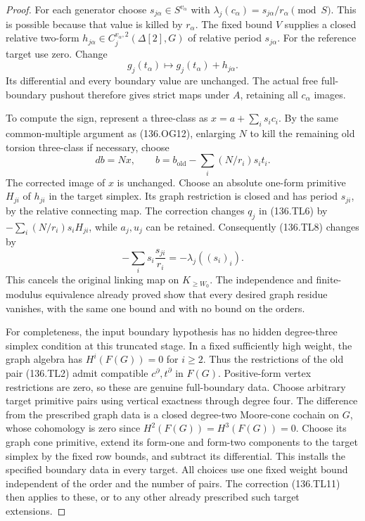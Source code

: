 \begin{proof}
For each generator choose \(s_{j\alpha}\in S^{v_\alpha}\)
with
\(\lambda_j(c_\alpha)=s_{j\alpha}/r_\alpha\pmod S\).
This is possible because that value is killed by \(r_\alpha\).
The fixed bound \(V\) supplies a closed relative two-form
\(h_{j\alpha}\in C_j^{v_\alpha,2}(\Delta[2],G)\)
of relative period \(s_{j\alpha}\).  For the reference
target use zero.  Change
\[
                   g_j(t_\alpha)\longmapsto
                                 g_j(t_\alpha)+h_{j\alpha}.
                                                               \tag{136.TL11}
\]
Its differential and every boundary value are unchanged.
The actual free full-boundary pushout therefore gives strict
maps under \(A\), retaining all \(c_\alpha\) images.

To compute the sign, represent a three-class as
\(x=a+\sum_i s_i c_i\).  By the same common-multiple
argument as (136.OG12), enlarging \(N\) to kill the
remaining old torsion three-class if necessary, choose
\[
               db=Nx,\qquad
               b=b_{\mathrm{old}}-
                            \sum_i(N/r_i)s_i t_i.
                                                               \tag{136.TL12}
\]
The corrected image of \(x\) is unchanged.  Choose an
absolute one-form primitive \(H_{ji}\) of \(h_{ji}\)
in the target simplex.  Its graph restriction is closed and
has period \(s_{ji}\), by the relative connecting map.
The correction changes \(q_j\) in (136.TL6) by
\(-\sum_i(N/r_i)s_i H_{ji}\), while \(a_j,u_j\)
can be retained.  Consequently (136.TL8) changes by
\[
                    -\sum_i s_i\frac{s_{ji}}{r_i}
                       =-\lambda_j((s_i)_i).
                                                               \tag{136.TL13}
\]
This cancels the original linking map on \(K_{\geq W_0}\).
The independence and finite-modulus equivalence already proved
show that every desired graph residue vanishes, with the same
one bound and with no bound on the orders.

For completeness, the input boundary hypothesis has no hidden
degree-three simplex condition at this truncated stage.  In a
fixed sufficiently high weight, the graph algebra has
\(H^i(F(G))=0\) for \(i\geq2\).  Thus the restrictions
of the old pair (136.TL2) admit compatible \(c^\partial,t^\partial\)
in \(F(G)\).  Positive-form vertex restrictions are zero,
so these are genuine full-boundary data.  Choose arbitrary
target primitive pairs using vertical exactness through degree
four.  The difference from the prescribed graph data is a
closed degree-two Moore-cone cochain on \(G\), whose
cohomology is zero since \(H^2(F(G))=H^3(F(G))=0\).
Choose its graph cone primitive, extend its form-one and
form-two components to the target simplex by the fixed row
bounds, and subtract its differential.  This installs the
specified boundary data in every target.  All choices use one
fixed weight bound independent of the order and the number
of pairs.  The correction (136.TL11) then applies to these,
or to any other already prescribed such target extensions.
\end{proof}

